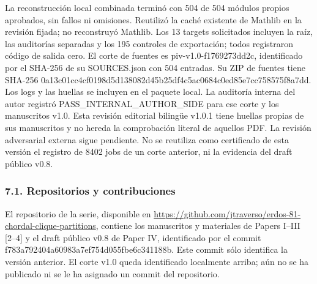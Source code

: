 \documentclass[spanish,11pt,a4paper]{article}
\begin{document}
La reconstrucción local combinada terminó con 504 de 504 módulos propios aprobados, sin fallos ni omisiones. Reutilizó la caché existente de Mathlib en la revisión fijada; no reconstruyó Mathlib. Los 13 targets solicitados incluyen la raíz, las auditorías separadas y los 195 controles de exportación; todos registraron código de salida cero. El corte de fuentes es {\ttfamily\small piv-\discretionary{\hbox{\ensuremath{\hookrightarrow}}}{}{}v1.\discretionary{\hbox{\ensuremath{\hookrightarrow}}}{}{}0-\discretionary{\hbox{\ensuremath{\hookrightarrow}}}{}{}f1769273dd2c}, identificado por el SHA-256 de su {\ttfamily\small SOURCES.\discretionary{\hbox{\ensuremath{\hookrightarrow}}}{}{}json} con 504 entradas. Su ZIP de fuentes tiene SHA-256 {\ttfamily\small 0a13c01cc4cf\discretionary{\hbox{\ensuremath{\hookrightarrow}}}{}{}0198d5d13808\discretionary{\hbox{\ensuremath{\hookrightarrow}}}{}{}2d45b25df4c5\discretionary{\hbox{\ensuremath{\hookrightarrow}}}{}{}ac0684c0ed85\discretionary{\hbox{\ensuremath{\hookrightarrow}}}{}{}e7cc758575f8\discretionary{\hbox{\ensuremath{\hookrightarrow}}}{}{}a7dd}. Los logs y las huellas se incluyen en el paquete local. La auditoría interna del autor registró {\ttfamily\small PASS\_\discretionary{\hbox{\ensuremath{\hookrightarrow}}}{}{}INTERNAL\_\discretionary{\hbox{\ensuremath{\hookrightarrow}}}{}{}AUTHOR\_\discretionary{\hbox{\ensuremath{\hookrightarrow}}}{}{}SIDE} para ese corte y los manuscritos v1.0. Esta revisión editorial bilingüe v1.0.1 tiene huellas propias de sus manuscritos y no hereda la comprobación literal de aquellos PDF. La revisión adversarial externa sigue pendiente. No se reutiliza como certificado de esta versión el registro de 8402 jobs de un corte anterior, ni la evidencia del draft público v0.8.

\subsubsection{7.1. Repositorios y contribuciones}\label{repositorios-y-contribuciones}

El repositorio de la serie, disponible en \url{https://github.com/jtraverso/erdos-81-chordal-clique-partitions}, contiene los manuscritos y materiales de Papers I--III {[}2--4{]} y el draft público v0.8 de Paper IV, identificado por el commit {\ttfamily\small f783a792404a\discretionary{\hbox{\ensuremath{\hookrightarrow}}}{}{}60983a7ef754\discretionary{\hbox{\ensuremath{\hookrightarrow}}}{}{}d055fbe6c341\discretionary{\hbox{\ensuremath{\hookrightarrow}}}{}{}188b}. Este commit sólo identifica la versión anterior. El corte v1.0 queda identificado localmente arriba; aún no se ha publicado ni se le ha asignado un commit del repositorio.
\end{document}
